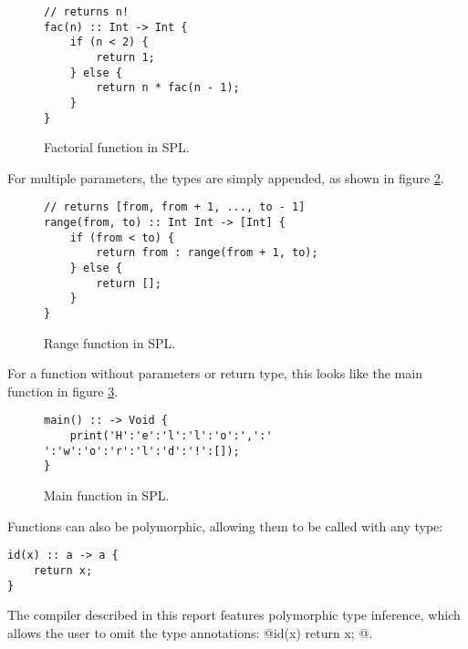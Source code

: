 \begin{figure}[!ht]
\centering
\begin{lstlisting}[language=spl]
// returns n!
fac(n) :: Int -> Int {
    if (n < 2) {
        return 1;
    } else {
        return n * fac(n - 1);
    }
}
\end{lstlisting}
\caption{Factorial function in SPL.}
\label{fig:fac}
\end{figure}

For multiple parameters, the types are simply appended, as shown in figure \ref{fig:range}.

\begin{figure}[!ht]
\centering
\begin{lstlisting}[language=spl]
// returns [from, from + 1, ..., to - 1]
range(from, to) :: Int Int -> [Int] {
    if (from < to) {
        return from : range(from + 1, to);
    } else {
        return [];
    }
}
\end{lstlisting}
\caption{Range function in SPL.}
\label{fig:range}
\end{figure}

For a function without parameters or return type, this looks like the main function in figure \ref{fig:main}.

\begin{figure}[!ht]
\centering
\begin{lstlisting}
main() :: -> Void {
    print('H':'e':'l':'l':'o':',':' ':'w':'o':'r':'l':'d':'!':[]);
}
\end{lstlisting}
\caption{Main function in SPL.}
\label{fig:main}
\end{figure}

Functions can also be polymorphic, allowing them to be called with any type:

\begin{lstlisting}
id(x) :: a -> a {
    return x;
}
\end{lstlisting}

The compiler described in this report features polymorphic type inference, which allows the user to omit the type annotations: @id(x) { return x; }@.



